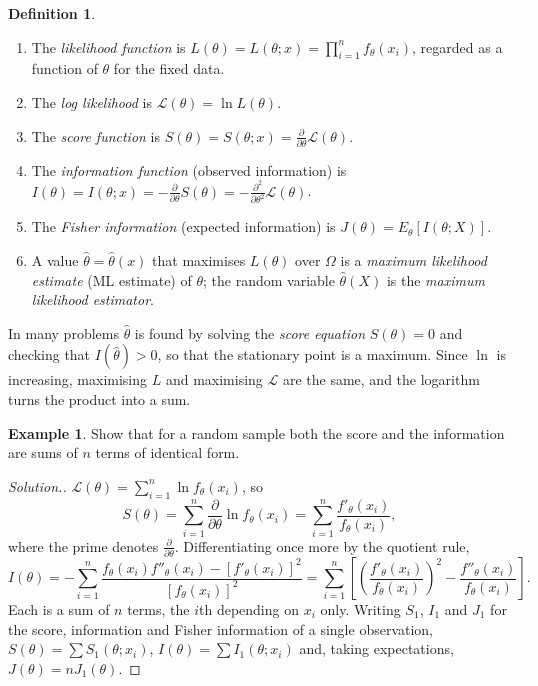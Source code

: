 \documentclass[12pt,a4paper]{report}
\theoremstyle{definition}
\newtheorem{defn}[thm]{Definition}
\newtheorem{exa}[thm]{Example}
\newenvironment{solution}
  {\renewcommand{\qedsymbol}{}\begin{proof}[\textit{Solution}.]}
  {\end{proof}}
\begin{document}
\begin{defn}
\label{def:likelihood}
\begin{enumerate}
\item The \emph{likelihood function} is $L(\theta) = L(\theta; x) = \prod^n_{i = 1} f_\theta(x_i)$,
regarded as a function of $\theta$ for the fixed data.
\item The \emph{log likelihood} is $\mathcal{L}(\theta) = \ln L(\theta)$.
\item The \emph{score function} is $S(\theta) = S(\theta; x) = \frac{\partial}{\partial\theta}\mathcal{L}(\theta)$.
\item The \emph{information function} (observed information) is
$I(\theta) = I(\theta; x) = -\frac{\partial}{\partial\theta}S(\theta) = -\frac{\partial^2}{\partial\theta^2}\mathcal{L}(\theta)$.
\item The \emph{Fisher information} (expected information) is
$J(\theta) = E_\theta\left[I(\theta; X)\right]$.
\item A value $\hat\theta = \hat\theta(x)$ that maximises $L(\theta)$ over $\Omega$ is a
\emph{maximum likelihood estimate} (ML estimate) of $\theta$; the random variable
$\hat\theta(X)$ is the \emph{maximum likelihood estimator}.
\end{enumerate}
\end{defn}

In many problems $\hat\theta$ is found by solving the \emph{score equation}
$S(\theta) = 0$ and checking that $I(\hat\theta)>0$, so that the stationary point is a
maximum. Since $\ln$ is increasing, maximising $L$ and maximising $\mathcal{L}$
are the same, and the logarithm turns the product into a sum.

\begin{exa}
\label{ex:scoresum}
Show that for a random sample both the score and the information are sums of $n$
terms of identical form.
\end{exa}

\begin{solution}
$\mathcal{L}(\theta) = \sum_{i=1}^n\ln f_\theta(x_i)$, so
\[S(\theta) = \sum^n_{i = 1}\frac{\partial}{\partial\theta}\ln f_\theta(x_i)
= \sum^n_{i = 1}\frac{f'_\theta(x_i)}{f_\theta(x_i)},\]
where the prime denotes $\frac{\partial}{\partial\theta}$. Differentiating once more
by the quotient rule,
\begin{equation}
\label{eq:infosum}
I(\theta) = -\sum^n_{i = 1}\frac{f_\theta(x_i)f''_\theta(x_i) - \left[f'_\theta(x_i)\right]^2}{\left[f_\theta(x_i)\right]^2}
= \sum^n_{i = 1}\left[\left(\frac{f'_\theta(x_i)}{f_\theta(x_i)}\right)^2 - \frac{f''_\theta(x_i)}{f_\theta(x_i)}\right].
\end{equation}
Each is a sum of $n$ terms, the $i$th depending on $x_i$ only. Writing $S_1$,
$I_1$ and $J_1$ for the score, information and Fisher information of a single
observation, $S(\theta) = \sum S_1(\theta; x_i)$, $I(\theta) = \sum I_1(\theta; x_i)$
and, taking expectations, $J(\theta) = nJ_1(\theta)$.
\end{solution}
\end{document}
